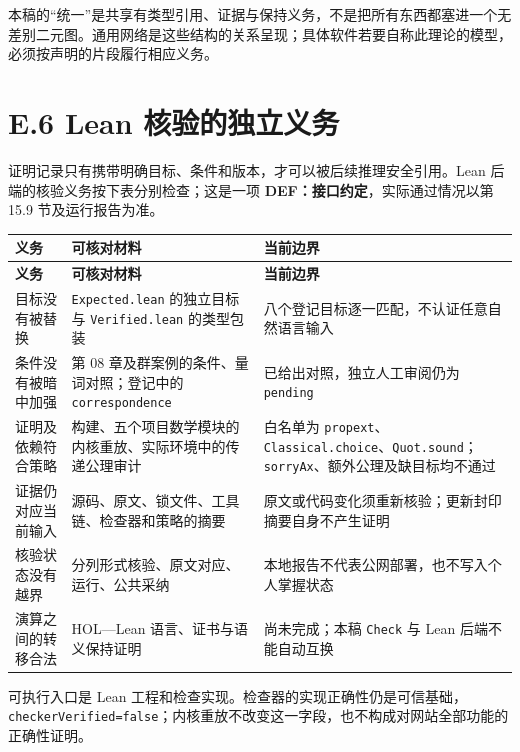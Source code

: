 \documentclass[UTF8,a4paper,zihao=-4,fontset=windows,openany]{ctexbook}
\newcommand{\mcsbrk}{\penalty 200\relax}
\begin{document}
本稿的“统一”是共享有类型引用、证据与保持义务，不是把所有东西都塞进一个无差别二元图。通用网络是这些结构的关系呈现；具体软件若要自称此理论的模型，必须按声明的片段履行相应义务。

\section{E.6 Lean 核验的独立义务}
证明记录只有携带明确目标、条件和版本，才可以被后续推理安全引用。Lean 后端的核验义务按下表分别检查；这是一项 \textbf{DEF：接口约定}，实际通过情况以第 15.9 节及运行报告为准。

\begingroup\small\setlength{\tabcolsep}{4pt}
\begin{longtable}{>{\raggedright\arraybackslash}p{}>{\raggedright\arraybackslash}p{}>{\raggedright\arraybackslash}p{}}
\toprule
\textbf{义务} & \textbf{可核对材料} & \textbf{当前边界} \\
\midrule
\endfirsthead
\toprule
\textbf{义务} & \textbf{可核对材料} & \textbf{当前边界} \\
\midrule
\endhead
\bottomrule
\endfoot
\bottomrule
\endlastfoot
目标没有被替换 & \texttt{Expected.\mcsbrk{}lean} 的独立目标与 \texttt{Verified.\mcsbrk{}lean} 的类型包装 & 八个登记目标逐一匹配，不认证任意自然语言输入 \\
条件没有被暗中加强 & 第 08 章及群案例的条件、量词对照；登记中的 \texttt{correspondence} & 已给出对照，独立人工审阅仍为 \texttt{pending} \\
证明及依赖符合策略 & 构建、五个项目数学模块的内核重放、实际环境中的传递公理审计 & 白名单为 \texttt{propext}、\texttt{Classical.\mcsbrk{}choice}、\texttt{Quot.\mcsbrk{}sound}；\texttt{sorryAx}、额外公理及缺目标均不通过 \\
证据仍对应当前输入 & 源码、原文、锁文件、工具链、检查器和策略的摘要 & 原文或代码变化须重新核验；更新封印摘要自身不产生证明 \\
核验状态没有越界 & 分列形式核验、原文对应、运行、公共采纳 & 本地报告不代表公网部署，也不写入个人掌握状态 \\
演算之间的转移合法 & HOL—Lean 语言、证书与语义保持证明 & 尚未完成；本稿 \texttt{Check} 与 Lean 后端不能自动互换 \\
\end{longtable}
\endgroup

可执行入口是 Lean 工程和检查实现。检查器的实现正确性仍是可信基础，\texttt{checkerVerified=false}；内核重放不改变这一字段，也不构成对网站全部功能的正确性证明。
\end{document}
